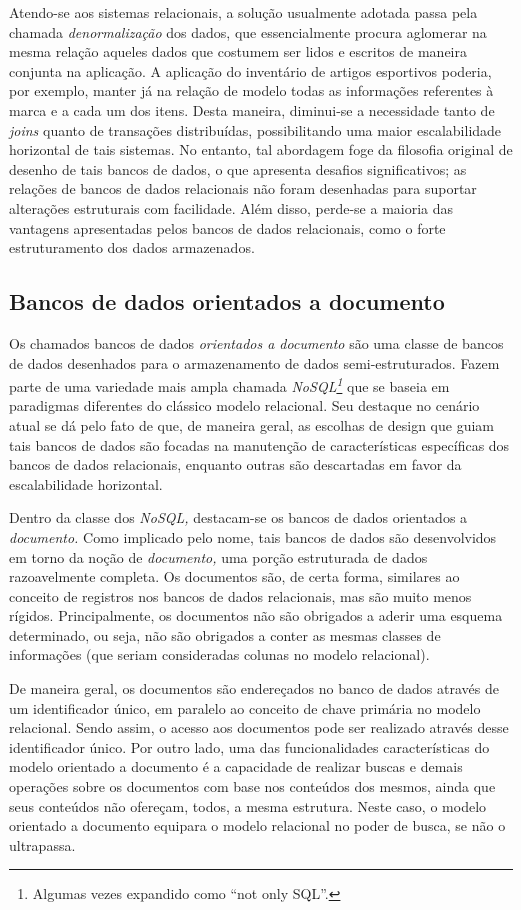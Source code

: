 \documentclass[ruledheader, 12pt]{abnt}
\begin{document}
Atendo-se aos sistemas relacionais, a solução usualmente adotada passa pela chamada \emph{denormalização} dos dados, que essencialmente procura aglomerar na mesma relação aqueles dados que costumem ser lidos e escritos de maneira conjunta na aplicação. A aplicação do inventário de artigos esportivos poderia, por exemplo, manter já na relação de modelo todas as informações referentes à marca e a cada um dos itens. Desta maneira, diminui-se a necessidade tanto de \emph{joins} quanto de transações distribuídas, possibilitando uma maior escalabilidade horizontal de tais sistemas. No entanto, tal abordagem foge da filosofia original de desenho de tais bancos de dados, o que apresenta desafios significativos; as relações de bancos de dados relacionais não foram desenhadas para suportar alterações estruturais com facilidade. Além disso, perde-se a maioria das vantagens apresentadas pelos bancos de dados relacionais, como o forte estruturamento dos dados armazenados.

\subsection{Bancos de dados orientados a documento}

Os chamados bancos de dados \emph{orientados a documento} são uma classe de bancos de dados desenhados para o armazenamento de dados semi-estruturados. Fazem parte de uma variedade mais ampla chamada  \emph{NoSQL\footnote{Algumas vezes expandido como ``not only SQL''.}} que se baseia em paradigmas diferentes do clássico modelo relacional. Seu destaque no cenário atual se dá pelo fato de que, de maneira geral, as escolhas de design que guiam tais bancos de dados são focadas na manutenção de características específicas dos bancos de dados relacionais, enquanto outras são descartadas em favor da escalabilidade horizontal.

Dentro da classe dos \emph{NoSQL,} destacam-se os bancos de dados orientados a \emph{documento.} Como implicado pelo nome, tais bancos de dados são desenvolvidos em torno da noção de \emph{documento,} uma porção estruturada de dados razoavelmente completa. Os documentos são, de certa forma, similares ao conceito de registros nos bancos de dados relacionais, mas são muito menos rígidos. Principalmente, os documentos não são obrigados a aderir uma esquema determinado, ou seja, não são obrigados a conter as mesmas classes de informações (que seriam consideradas colunas no modelo relacional).

De maneira geral, os documentos são endereçados no banco de dados através de um identificador único, em paralelo ao conceito de chave primária no modelo relacional. Sendo assim, o acesso aos documentos pode ser realizado através desse identificador único. Por outro lado, uma das funcionalidades características do modelo orientado a documento é a capacidade de realizar buscas e demais operações sobre os documentos com base nos conteúdos dos mesmos, ainda que seus conteúdos não ofereçam, todos, a mesma estrutura. Neste caso, o modelo orientado a documento equipara o modelo relacional no poder de busca, se não o ultrapassa.
\end{document}
